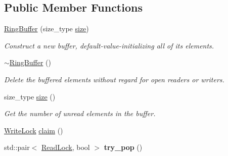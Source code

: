 \subsection*{Public Member Functions}
\begin{DoxyCompactItemize}
\item 
\hypertarget{classsma_1_1RingBuffer_a2a7fcb8fc464ffe0753d8c7911c0176a}{\hyperlink{classsma_1_1RingBuffer_a2a7fcb8fc464ffe0753d8c7911c0176a}{Ring\-Buffer} (size\-\_\-type \hyperlink{classsma_1_1RingBuffer_a48da46c41f1c0af479a4f10baba08675}{size})}\label{classsma_1_1RingBuffer_a2a7fcb8fc464ffe0753d8c7911c0176a}

\begin{DoxyCompactList}\small\item\em Construct a new buffer, default-\/value-\/initializing all of its elements. \end{DoxyCompactList}\item 
\hypertarget{classsma_1_1RingBuffer_a502396596d2283ce2a4ea70b29dcb261}{\hyperlink{classsma_1_1RingBuffer_a502396596d2283ce2a4ea70b29dcb261}{$\sim$\-Ring\-Buffer} ()}\label{classsma_1_1RingBuffer_a502396596d2283ce2a4ea70b29dcb261}

\begin{DoxyCompactList}\small\item\em Delete the buffered elements without regard for open readers or writers. \end{DoxyCompactList}\item 
\hypertarget{classsma_1_1RingBuffer_a48da46c41f1c0af479a4f10baba08675}{size\-\_\-type \hyperlink{classsma_1_1RingBuffer_a48da46c41f1c0af479a4f10baba08675}{size} ()}\label{classsma_1_1RingBuffer_a48da46c41f1c0af479a4f10baba08675}

\begin{DoxyCompactList}\small\item\em Get the number of unread elements in the buffer. \end{DoxyCompactList}\item 
\hyperlink{structsma_1_1RingBuffer_1_1WriteLock}{Write\-Lock} \hyperlink{classsma_1_1RingBuffer_a8b76dd129e7c56227debc2ce42cbc5a7}{claim} ()
\item 
\hypertarget{classsma_1_1RingBuffer_ad9fea9ba42fb18a0804b7ac0fa881189}{std\-::pair$<$ \hyperlink{structsma_1_1RingBuffer_1_1ReadLock}{Read\-Lock}, bool $>$ {\bfseries try\-\_\-pop} ()}\label{classsma_1_1RingBuffer_ad9fea9ba42fb18a0804b7ac0fa881189}

\end{DoxyCompactItemize}


